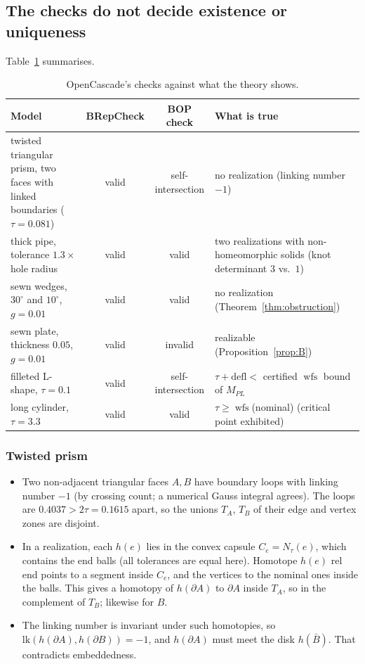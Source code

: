 \documentclass[preprint,12pt]{elsarticle}
\theoremstyle{definition}
\theoremstyle{remark}
\newcommand{\wfs}{\operatorname{wfs}}
\begin{document}
\subsection{The checks do not decide existence or uniqueness}
Table~\ref{tab:occ} summarises.

\begin{table}[h]
\centering\small
\begin{tabular}{>{\raggedright}p{4.4cm}cc>{\raggedright\arraybackslash}p{5.0cm}}
\toprule
Model & BRepCheck & BOP check & What is true \\
\midrule
twisted triangular prism, two faces with linked boundaries ($\tau=0.081$) & valid & self-intersection & no
realization (linking number $-1$) \\
thick pipe, tolerance $1.3\times$ hole radius & valid & valid & two realizations with non-homeomorphic solids
(knot determinant $3$ vs.\ $1$) \\
sewn wedges, $30^\circ$ and $10^\circ$, $g=0.01$ & valid & valid & no realization
(Theorem~\ref{thm:obstruction}) \\
sewn plate, thickness $0.05$, $g=0.01$ & valid & invalid & realizable (Proposition~\ref{prop:B}) \\
filleted L-shape, $\tau=0.1$ & valid & self-intersection & $\tau+\mathrm{defl}<$ certified $\wfs$ bound of
$M_{PL}$ \\
long cylinder, $\tau=3.3$ & valid & valid & $\tau\ge\wfs$(nominal) (critical point exhibited) \\
\bottomrule
\end{tabular}
\caption{OpenCascade's checks against what the theory shows.}\label{tab:occ}
\end{table}

\subsubsection*{Twisted prism}
\begin{itemize}
\item Two non-adjacent triangular faces $A,B$ have boundary loops with linking number $-1$ (by crossing count; a
numerical Gauss integral agrees). The loops are $0.4037>2\tau=0.1615$ apart, so the unions $T_A$, $T_B$ of
their edge and vertex zones are disjoint.
\item In a realization, each $h(e)$ lies in the convex capsule $C_e=N_\tau(e)$, which contains the end balls (all
tolerances are equal here). Homotope $h(e)$ rel end points to a segment inside $C_e$, and the vertices to the
nominal ones inside the balls. This gives a homotopy of $h(\partial A)$ to $\partial A$ inside $T_A$, so in the
complement of $T_B$; likewise for $B$.
\item The linking number is invariant under such homotopies, so $\mathrm{lk}(h(\partial A),h(\partial B))=-1$, and
$h(\partial A)$ must meet the disk $h(\bar B)$. That contradicts embeddedness.
\end{itemize}
\end{document}
